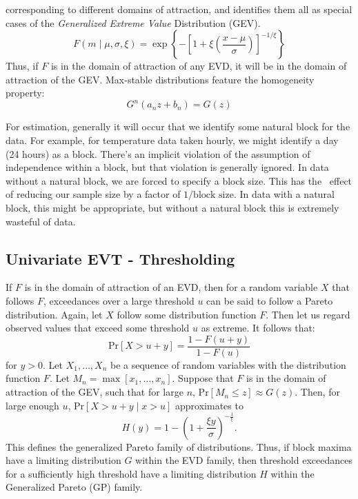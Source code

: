   corresponding to different domains of attraction, and identifies them all as
  special cases of the \emph{Generalized Extreme Value} Distribution (GEV).
\begin{equation*}
  \label{eqn:gev}
  F(m \mid \mu, \sigma, \xi) = \exp\left\lbrace-\left[1 + \xi\left(\frac{x - \mu}{\sigma}\right)\right]^{-1/{\xi}}\right\rbrace
\end{equation*}
Thus, if $F$ is in the domain of attraction of any EVD, it will be in the domain
  of attraction of the GEV.  Max-stable distributions feature the homogeneity
  property:
\begin{equation*}
G^n(a_nz + b_n) = G(z)
\end{equation*}

For estimation, generally it will occur that we identify some natural block for
  the data.  For example, for temperature data taken hourly, we might identify a
  day (24 hours) as a block.  There's an implicit violation of the assumption of
  independence within a block, but that violation is generally ignored.  In data
  without a natural block, we are forced to specify a block size.  This has the \
  effect of reducing our sample size by a factor of $1/\text{block size}$.  In
  data with a natural block, this might be appropriate, but without a natural
  block this is extremely wasteful of data.

\subsection{Univariate EVT - Thresholding}
If $F$ is in the domain of attraction of an EVD, then for a random variable $X$
  that follows $F$, exceedances over a large threshold $u$ can be said to follow
  a Pareto distribution.  Again, let $X$ follow some distribution function $F$.
  Then let us regard observed values that exceed some threshold $u$ as extreme.
  It follows that:
\begin{equation*}
\text{Pr}\left[X > u + y\right] = \frac{1 - F(u + y)}{1 - F(u)}
\end{equation*}
for $y > 0$.  Let $X_1,\ldots,X_n$ be a sequence of random variables with the
  distribution function $F$.  Let $M_n = \max[x_1,\ldots,x_n]$.  Suppose that
  $F$ is in the domain of attraction of the GEV, such that for large $n$,
  $\text{Pr}[M_n \leq z]\approx G(z)$.  Then, for large enough $u$,
  $\text{Pr}[X > u+y\mid x > u]$ approximates to
\begin{equation*}
  \label{eqn:gp}
H(y) = 1 - \left(1 + \frac{\xi y}{\sigma}\right)^{-\frac{1}{\xi}}.
\end{equation*}
This defines the generalized Pareto family of distributions.  Thus, if block
  maxima have a limiting distribution $G$ within the EVD family, then threshold
  exceedances for a sufficiently high threshold have a limiting distribution $H$
  within the Generalized Pareto (GP) family.

